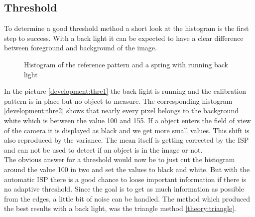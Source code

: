 \subsection{Threshold}
To determine a good threshold method a short look at the histogram is the first step to success. With a back light it can be expected to have a clear difference between foreground and background of the image. 
\begin{figure}[H]
	\caption{Histogram of the reference pattern and a spring with running back light\label{development:thre}}	
\end{figure}
\newpage
In the picture \ref{development:thre1} the back light is running and the calibration pattern is in place but no object to measure. The corresponding histogram \ref{development:thre2} shows that nearly every pixel belongs to the background white which is between the value 100 and 155. If a object enters the field of view of the camera it is displayed as black and we get more small values. This shift is also reproduced by the variance. The mean itself is getting corrected by the ISP and can not be used to detect if an object is in the image or not.\\
The obvious answer for a threshold would now be to just cut the histogram around the value 100 in two and set the values to black and white. But with the automatic ISP there is a good chance to loose important information if there is no adaptive threshold. Since the goal is to get as much information as possible from the edges, a little bit of noise can be handled. The method which produced the best results with a back light, was the triangle method \ref{theory:triangle}.


